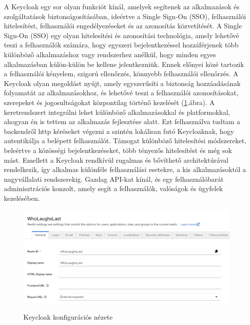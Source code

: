 \documentclass[a4paper,twoside]{article}
\begin{document}
A Keycloak egy sor olyan funkciót kínál, amelyek segítenek az alkalmazások és szolgáltatások biztonságosításában, ideértve a Single Sign-On (SSO), felhasználói hitelesítést, felhasználói engedélyezéseket és az azonosítás közvetítését. A Single Sign-On (SSO) egy olyan hitelesítési és azonosítási technológia, amely lehetővé teszi a felhasználók számára, hogy egyszeri bejelentkezéssel hozzáférjenek több különböző alkalmazáshoz vagy rendszerhez anélkül, hogy minden egyes alkalmazásban külön-külön be kellene jelentkezniük. Ennek előnyei közé tartozik a felhasználói kényelem, szigorú ellenőrzés, könnyebb felhasználói ellenőrzés. A Keycloak olyan megoldást nyújt, amely egyszerűsíti a biztonság hozzáadásának folyamatát az alkalmazásokhoz, és lehetővé teszi a felhasználói azonosításokat, szerepeket és jogosultságokat központilag történő kezelését (\ref{keycloak-login}.ábra). A keretrendszert integrálni lehet különböző alkalmazásokkal és platformokkal, ahogyan én is tettem az alkalmazás fejlesztése alatt. Ezt felhasználva tudtam a backendről http kéréseket végezni a szintén lokálisan futó Keycloaknak, hogy autentikálja a belépett felhasználót. Támogat különböző hitelesítési módszereket, beleértve a közösségi bejelentkezéseket, több tényezős hitelesítést és még sok mást. Emellett a Keycloak rendkívül rugalmas és bővíthető architektúrával rendelkezik, így alkalmas különféle felhasználási esetekre, a kis alkalmazásoktól a nagyvállalati rendszerekig. Gazdag API-kat kínál, és egy felhasználóbarát adminisztrációs konzolt, amely segít a felhasználók, valóságok és ügyfelek kezelésében.

\begin{figure}
	\caption{Keycloak konfigurációs nézete}
	\includegraphics[scale=0.5]{keycloak-login}
	\label{keycloak-login}
\end{figure}
\end{document}
